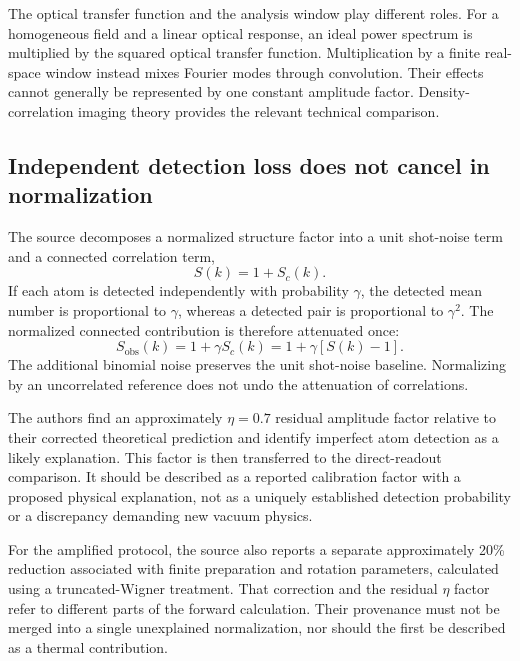 \documentclass[11pt,a4paper]{article}
\theoremstyle{definition}
\theoremstyle{remark}
\begin{document}
The optical transfer function and the analysis window play different roles. For a homogeneous field and a linear optical response, an ideal power spectrum is multiplied by the squared optical transfer function. Multiplication by a finite real-space window instead mixes Fourier modes through convolution. Their effects cannot generally be represented by one constant amplitude factor. Density-correlation imaging theory provides the relevant technical comparison.\cite{hung}

\subsection{Independent detection loss does not cancel in normalization}
The source decomposes a normalized structure factor into a unit shot-noise term and a connected correlation term,
\begin{equation}
 S(k)=1+S_c(k).
 \label{eq:structure_split}
\end{equation}
If each atom is detected independently with probability $\gamma$, the detected mean number is proportional to $\gamma$, whereas a detected pair is proportional to $\gamma^2$. The normalized connected contribution is therefore attenuated once:
\begin{equation}
 S_{\mathrm{obs}}(k)=1+\gamma S_c(k)
 =1+\gamma[S(k)-1].
 \label{eq:thinning}
\end{equation}
The additional binomial noise preserves the unit shot-noise baseline. Normalizing by an uncorrelated reference does not undo the attenuation of correlations.\cite{zhang2026}

The authors find an approximately $\eta=0.7$ residual amplitude factor relative to their corrected theoretical prediction and identify imperfect atom detection as a likely explanation. This factor is then transferred to the direct-readout comparison. It should be described as a reported calibration factor with a proposed physical explanation, not as a uniquely established detection probability or a discrepancy demanding new vacuum physics.\cite{zhang2026}

For the amplified protocol, the source also reports a separate approximately 20\% reduction associated with finite preparation and rotation parameters, calculated using a truncated-Wigner treatment. That correction and the residual $\eta$ factor refer to different parts of the forward calculation. Their provenance must not be merged into a single unexplained normalization, nor should the first be described as a thermal contribution.\cite{zhang2026,blakie}
\end{document}
